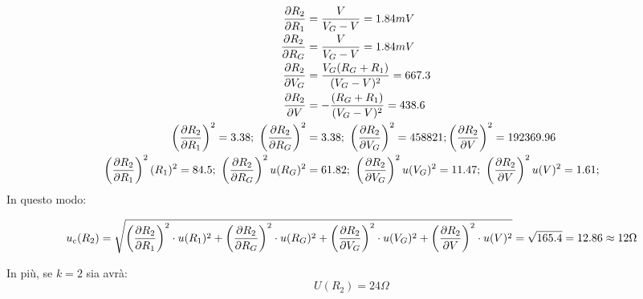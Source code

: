\documentclass[a4paper, 15pt]{article}
\begin{document}
  		 \[ \begin{array}{c}
  		 	\begin{aligned}
  		 		{\partial R_2\over\partial R_1} & = \dfrac{V}{V_G-V} = 1.84 mV  \\
  		 		{\partial R_2\over\partial R_G} & = \dfrac{V}{V_G-V} = 1.84 mV \\
  		 		{\partial R_2\over\partial V_G} & = \dfrac{V_G(R_G+R_1)}{(V_G-V)^2}  = 667.3  \\
  		 		{\partial R_2\over\partial V} & =  -\dfrac{(R_G+R_1)}{(V_G-V)^2} = 438.6 \\
  		 		
  		 		 \left({\partial R_2\over\partial R_1}\right)^2 = 3.38; ~ \left({\partial R_2\over\partial R_G}\right)^2 & = 3.38; ~ \left({\partial R_2\over\partial V_G}\right)^2 = 458821; \left({\partial R_2\over\partial V}\right)^2 = 192369.96 \\  
  		 		 
  		 		  \left({\partial R_2\over\partial R_1}\right)^2(R_1)^2 = 84.5 ; ~ \left({\partial R_2\over\partial R_G}\right)^2u(R_G)^2 & = 61.82 ; ~ \left({\partial R_2\over\partial V_G}\right)^2u(V_G)^2 = 11.47 ; ~ \left({\partial R_2\over\partial V}\right)^2u(V)^2 = 1.61 ;
  		 	\end{aligned}
  		 \end{array}
  		 \]
  		 In questo modo:
  		  		 
  		 \[ 
  		 	u_c(R_2)  =\sqrt{\left({\partial R_2\over\partial R_1}\right)^2\cdot u(R_1)^2 + \left({\partial R_2\over\partial R_G}\right)^2\cdot u(R_G)^2 + \left({\partial R_2\over\partial V_G}\right)^2\cdot u(V_G)^2 + \left({\partial R_2\over\partial V}\right)^2\cdot u(V)^2 } = \sqrt{165.4} = 12.86\approx 12\Omega
  		 \]
  		 \begin{adjustwidth}{2in}{} 
  		 In più, se $k=2$ sia avrà:
  		 \[U(R_2) = 24\Omega\]  		 
\end{adjustwidth}
\newpage
\end{document}
